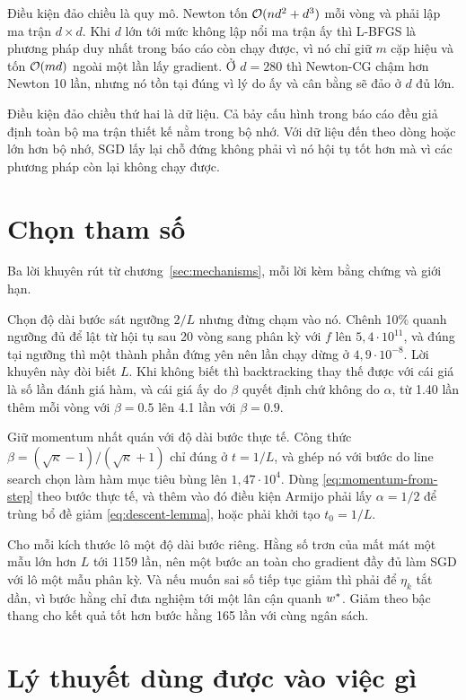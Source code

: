 Điều kiện đảo chiều là quy mô. Newton tốn $\mathcal{O}(nd^{2} + d^{3})$ mỗi vòng và
phải lập ma trận $d \times d$. Khi $d$ lớn tới mức không lập nổi ma trận ấy thì
L-BFGS là phương pháp duy nhất trong báo cáo còn chạy được, vì nó chỉ giữ $m$ cặp
hiệu và tốn $\mathcal{O}(md)$ ngoài một lần lấy gradient. Ở $d = 280$ thì Newton-CG
chậm hơn Newton 10 lần, nhưng nó tồn tại đúng vì lý do ấy và cân bằng sẽ đảo ở
$d$ đủ lớn.

Điều kiện đảo chiều thứ hai là dữ liệu. Cả bảy cấu hình trong báo cáo đều giả
định toàn bộ ma trận thiết kế nằm trong bộ nhớ. Với dữ liệu đến theo dòng hoặc
lớn hơn bộ nhớ, SGD lấy lại chỗ đứng không phải vì nó hội tụ tốt hơn mà vì các
phương pháp còn lại không chạy được.

\section{Chọn tham số}
\label{sec:conclusion-parameters}

Ba lời khuyên rút từ chương~\ref{sec:mechanisms}, mỗi lời kèm bằng chứng và giới
hạn.

Chọn độ dài bước sát ngưỡng $2/L$ nhưng đừng chạm vào nó. Chênh 10\% quanh ngưỡng
đủ để lật từ hội tụ sau 20 vòng sang phân kỳ với $f$ lên $5{,}4 \cdot 10^{11}$,
và đúng tại ngưỡng thì một thành phần đứng yên nên lần chạy dừng ở
$4{,}9 \cdot 10^{-8}$. Lời khuyên này đòi biết $L$. Khi không biết thì
backtracking thay thế được với cái giá là số lần đánh giá hàm, và cái giá ấy do
$\beta$ quyết định chứ không do $\alpha$, từ \num{1.40} lần thêm mỗi vòng với
$\beta = 0.5$ lên \num{4.1} lần với $\beta = 0.9$.

Giữ momentum nhất quán với độ dài bước thực tế. Công thức
$\beta = (\sqrt{\kappa}-1)/(\sqrt{\kappa}+1)$ chỉ đúng ở $t = 1/L$, và ghép nó
với bước do line search chọn làm hàm mục tiêu bùng lên $1{,}47 \cdot 10^{4}$.
Dùng \eqref{eq:momentum-from-step} theo bước thực tế, và thêm vào đó điều kiện
Armijo phải lấy $\alpha = 1/2$ để trùng bổ đề giảm \eqref{eq:descent-lemma}, hoặc
phải khởi tạo $t_0 = 1/L$.

Cho mỗi kích thước lô một độ dài bước riêng. Hằng số trơn của mất mát một mẫu lớn
hơn $L$ tới 1159 lần, nên một bước an toàn cho gradient đầy đủ làm SGD với lô một
mẫu phân kỳ. Và nếu muốn sai số tiếp tục giảm thì phải để $\eta_k$ tắt dần, vì
bước hằng chỉ đưa nghiệm tới một lân cận quanh $w^{*}$. Giảm theo bậc thang cho
kết quả tốt hơn bước hằng 165 lần với cùng ngân sách.

\section{Lý thuyết dùng được vào việc gì}
\label{sec:conclusion-theory}

